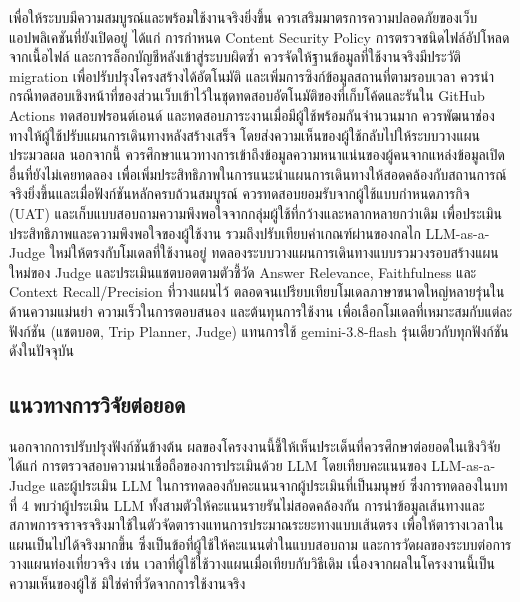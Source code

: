 เพื่อให้ระบบมีความสมบูรณ์และพร้อมใช้งานจริงยิ่งขึ้น ควรเสริมมาตรการความปลอดภัยของเว็บแอปพลิเคชันที่ยังเปิดอยู่ ได้แก่ การกำหนด Content Security Policy การตรวจชนิดไฟล์อัปโหลดจากเนื้อไฟล์ และการล็อกบัญชีหลังเข้าสู่ระบบผิดซ้ำ ควรจัดให้ฐานข้อมูลที่ใช้งานจริงมีประวัติ migration เพื่อปรับปรุงโครงสร้างได้อัตโนมัติ และเพิ่มการซิงก์ข้อมูลสถานที่ตามรอบเวลา ควรนำกรณีทดสอบเชิงหน้าที่ของส่วนเว็บเข้าไว้ในชุดทดสอบอัตโนมัติของที่เก็บโค้ดและรันใน GitHub Actions ทดสอบฟรอนต์เอนด์ และทดสอบภาระงานเมื่อมีผู้ใช้พร้อมกันจำนวนมาก ควรพัฒนาช่องทางให้ผู้ใช้ปรับแผนการเดินทางหลังสร้างเสร็จ โดยส่งความเห็นของผู้ใช้กลับไปให้ระบบวางแผนประมวลผล นอกจากนี้ ควรศึกษาแนวทางการเข้าถึงข้อมูลความหนาแน่นของผู้คนจากแหล่งข้อมูลเปิดอื่นที่ยังไม่เคยทดลอง เพื่อเพิ่มประสิทธิภาพในการแนะนำแผนการเดินทางให้สอดคล้องกับสถานการณ์จริงยิ่งขึ้นและเมื่อฟังก์ชันหลักครบถ้วนสมบูรณ์ ควรทดสอบยอมรับจากผู้ใช้แบบกำหนดภารกิจ (UAT) และเก็บแบบสอบถามความพึงพอใจจากกลุ่มผู้ใช้ที่กว้างและหลากหลายกว่าเดิม เพื่อประเมินประสิทธิภาพและความพึงพอใจของผู้ใช้งาน รวมถึงปรับเทียบค่าเกณฑ์ผ่านของกลไก LLM-as-a-Judge ใหม่ให้ตรงกับโมเดลที่ใช้งานอยู่ ทดลองระบบวางแผนการเดินทางแบบรวมวงรอบสร้างแผนใหม่ของ Judge และประเมินแชตบอตตามตัวชี้วัด Answer Relevance, Faithfulness และ Context Recall/Precision ที่วางแผนไว้ ตลอดจนเปรียบเทียบโมเดลภาษาขนาดใหญ่หลายรุ่นในด้านความแม่นยำ ความเร็วในการตอบสนอง และต้นทุนการใช้งาน เพื่อเลือกโมเดลที่เหมาะสมกับแต่ละฟังก์ชัน (แชตบอต, Trip Planner, Judge) แทนการใช้ gemini-3.8-flash รุ่นเดียวกับทุกฟังก์ชันดังในปัจจุบัน

\subsection{แนวทางการวิจัยต่อยอด}

นอกจากการปรับปรุงฟังก์ชันข้างต้น ผลของโครงงานนี้ชี้ให้เห็นประเด็นที่ควรศึกษาต่อยอดในเชิงวิจัย ได้แก่ การตรวจสอบความน่าเชื่อถือของการประเมินด้วย LLM โดยเทียบคะแนนของ LLM-as-a-Judge และผู้ประเมิน LLM ในการทดลองกับคะแนนจากผู้ประเมินที่เป็นมนุษย์ ซึ่งการทดลองในบทที่ 4 พบว่าผู้ประเมิน LLM ทั้งสามตัวให้คะแนนรายรันไม่สอดคล้องกัน การนำข้อมูลเส้นทางและสภาพการจราจรจริงมาใช้ในตัวจัดตารางแทนการประมาณระยะทางแบบเส้นตรง เพื่อให้ตารางเวลาในแผนเป็นไปได้จริงมากขึ้น ซึ่งเป็นข้อที่ผู้ใช้ให้คะแนนต่ำในแบบสอบถาม และการวัดผลของระบบต่อการวางแผนท่องเที่ยวจริง เช่น เวลาที่ผู้ใช้ใช้วางแผนเมื่อเทียบกับวิธีเดิม เนื่องจากผลในโครงงานนี้เป็นความเห็นของผู้ใช้ มิใช่ค่าที่วัดจากการใช้งานจริง
